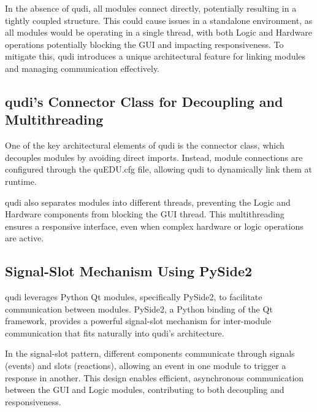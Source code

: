 In the absence of qudi, all modules connect directly, potentially resulting in a tightly coupled structure. This could cause issues in a standalone environment, as all modules would be operating in a single thread, with both Logic and Hardware operations potentially blocking the GUI and impacting responsiveness. To mitigate this, qudi introduces a unique architectural feature for linking modules and managing communication effectively.

\subsection{qudi’s Connector Class for Decoupling and Multithreading}

One of the key architectural elements of qudi is the connector class, which decouples modules by avoiding direct imports. Instead, module connections are configured through the quEDU.cfg file, allowing qudi to dynamically link them at runtime.

qudi also separates modules into different threads, preventing the Logic and Hardware components from blocking the GUI thread. This multithreading ensures a responsive interface, even when complex hardware or logic operations are active.

\subsection{Signal-Slot Mechanism Using PySide2}

qudi leverages Python Qt modules, specifically PySide2, to facilitate communication between modules. PySide2, a Python binding of the Qt framework, provides a powerful signal-slot mechanism for inter-module communication that fits naturally into qudi’s architecture.

In the signal-slot pattern, different components communicate through signals (events) and slots (reactions), allowing an event in one module to trigger a response in another. This design enables efficient, asynchronous communication between the GUI and Logic modules, contributing to both decoupling and responsiveness.


